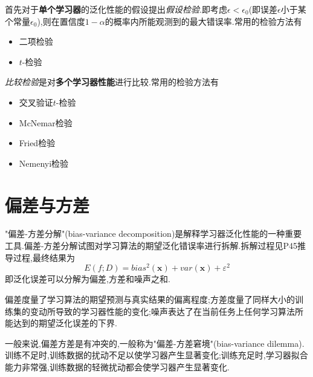 首先对于\textbf{单个学习器}的泛化性能的假设提出\textit{假设检验}.即考虑$\epsilon<\epsilon_0$(即误差$\epsilon$小于某个常量$\epsilon_0$),则在置信度$1-\alpha$的概率内所能观测到的最大错误率.常用的检验方法有
\begin{itemize}
    \item 二项检验
    \item $t$-检验
\end{itemize}

\textit{比较检验}是对\textbf{多个学习器性能}进行比较.常用的检验方法有
\begin{itemize}
    \item 交叉验证$t$-检验
    \item McNemar检验
    \item Fried检验
    \item Nemenyi检验
\end{itemize}

\section{偏差与方差}

"偏差-方差分解"(bias-variance decomposition)是解释学习器泛化性能的一种重要工具.偏差-方差分解试图对学习算法的期望泛化错误率进行拆解.拆解过程见P45推导过程,最终结果为
\begin{equation}
E(f;D)=bias^2(\mathbf x)+var(\mathbf x)+\varepsilon^2
\end{equation}
即泛化误差可以分解为偏差,方差和噪声之和.

偏差度量了学习算法的期望预测与真实结果的偏离程度;方差度量了同样大小的训练集的变动所导致的学习器性能的变化;噪声表达了在当前任务上任何学习算法所能达到的期望泛化误差的下界.

一般来说,偏差方差是有冲突的,一般称为"偏差-方差窘境"(bias-variance dilemma).训练不足时,训练数据的扰动不足以使学习器产生显著变化;训练充足时,学习器拟合能力非常强,训练数据的轻微扰动都会使学习器产生显著变化.